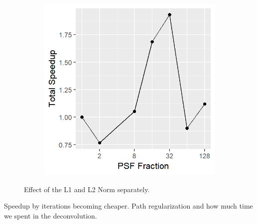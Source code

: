 \begin{figure}[h]
\begin{subfigure}[b]{0.35\linewidth}
	\end{subfigure}
	\begin{subfigure}[b]{0.35\linewidth}
		\includegraphics[width=\linewidth]{./chapters/10.results/gradient/speedup_total.png}
	\end{subfigure}
	
	\caption{Effect of the L1 and L2 Norm separately.}
	\label{results:gradients:size}
\end{figure}

Speedup by iterations becoming cheaper.
Path regularization and how much time we spent in the deconvolution.


